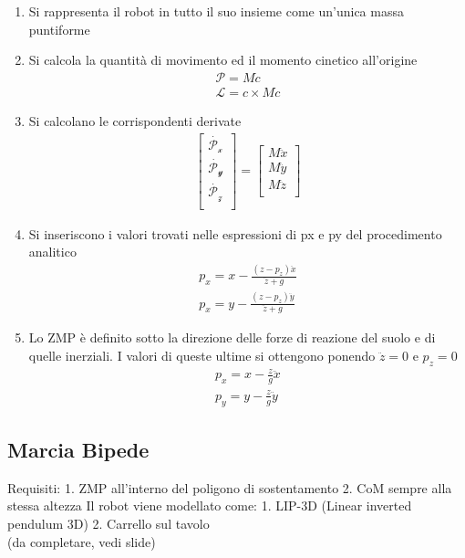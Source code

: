\documentclass[a4paper,portrait,12pt]{article}
\theoremstyle{definition}
\begin{document}
\begin{enumerate}
\item Si rappresenta il robot in tutto il suo insieme come
un’unica massa puntiforme
\item Si calcola la quantità di movimento ed il momento
cinetico all’origine
\begin{align*}
\mathcal{P} = M \dot{c}\\
\mathcal{L} = c \times M \dot{c}
\end{align*}
\item Si calcolano le corrispondenti derivate
\begin{align*}
\left[\begin{array}{c}
\dot{\mathcal{P_x}}\\
\dot{\mathcal{P_y}}\\
\dot{\mathcal{P_z}}\\
\end{array}\right]
=
\left[\begin{array}{c}
M\ddot{x}\\
M\ddot{y}\\
M\ddot{z}\\
\end{array}\right]
\end{align*}
\item Si inseriscono i valori trovati nelle espressioni di px e py del
procedimento analitico
\begin{align*}
p_x = x - \frac{(z - p_z)\ddot{x}}{\ddot{z}+g}\\
p_x = y - \frac{(z - p_z)\ddot{y}}{\ddot{z}+g}
\end{align*}
\item Lo ZMP è definito sotto la direzione delle forze di reazione del
suolo e di quelle inerziali. I valori di queste ultime si ottengono
ponendo $\ddot{z} = 0$ e $p_z
= 0$
\begin{align*}
p_x = x - \frac{z}{g}\ddot{x}\\
p_y = y - \frac{z}{g}\ddot{y}
\end{align*}
\end{enumerate}

\subsection{Marcia Bipede}

Requisiti:
1. ZMP all’interno del poligono di sostentamento
2. CoM sempre alla stessa altezza
Il robot viene modellato come:
1. LIP-3D (Linear inverted pendulum 3D)
2. Carrello sul tavolo\\
(da completare, vedi slide)
\end{document}
